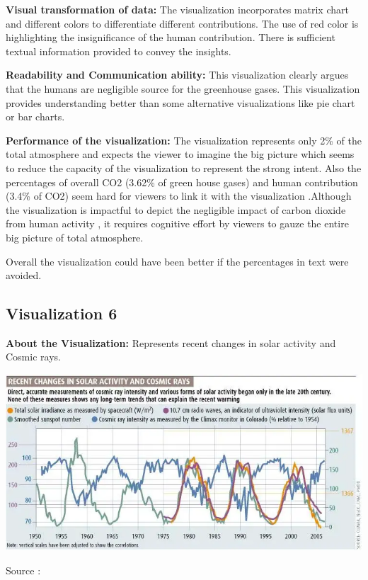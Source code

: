 \documentclass[]{book}
\begin{document}
\textbf{Visual transformation of data:} The visualization incorporates matrix chart and different colors to differentiate different contributions. The use of red color is highlighting the insignificance of the human contribution. There is sufficient textual information provided to convey the insights.

\textbf{Readability and Communication ability:} This visualization clearly argues that the humans are negligible source for the greenhouse gases. This visualization provides understanding better than some alternative visualizations like pie chart or bar charts.

\textbf{Performance of the visualization:} The visualization represents only 2\% of the total atmosphere and expects the viewer to imagine the big picture which seems to reduce the capacity of the visualization to represent the strong intent. Also the percentages of overall CO2 (3.62\% of green house gases) and human contribution (3.4\% of CO2) seem hard for viewers to link it with the visualization .Although the visualization is impactful to depict the negligible impact of carbon dioxide from human activity , it requires cognitive effort by viewers to gauze the entire big picture of total atmosphere.

Overall the visualization could have been better if the percentages in text were avoided.

\hypertarget{visualization-6}{%
\subsection{Visualization 6}\label{visualization-6}}

\textbf{About the Visualization:} Represents recent changes in solar activity and Cosmic rays.

\includegraphics{images/Vz7.png}

Source :\citep{ClimateMyth}
\end{document}
